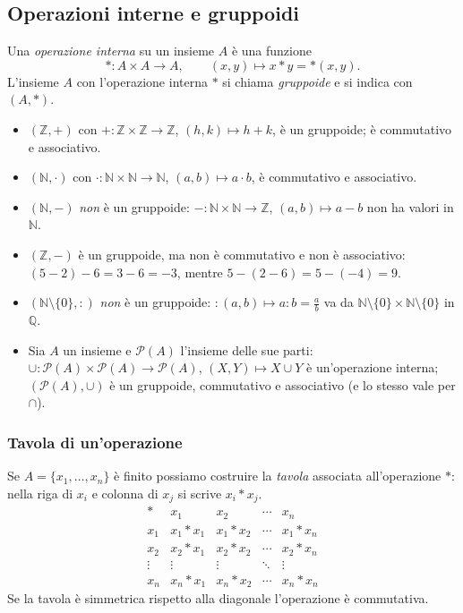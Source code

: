 \documentclass[11pt,a4paper]{article}
\begin{document}
\subsection{Operazioni interne e gruppoidi}

\begin{definizione}
Una \emph{operazione interna} su un insieme $A$ è una funzione
\[
  * : A \times A \to A, \qquad (x, y) \mapsto x * y = {*}(x, y).
\]
L'insieme $A$ con l'operazione interna $*$ si chiama \emph{gruppoide} e si indica con $(A, *)$.
\end{definizione}

\begin{esempio}
\begin{itemize}
  \item $(\mathbb{Z}, +)$ con $+ : \mathbb{Z}\times\mathbb{Z} \to \mathbb{Z}$, $(h, k) \mapsto h + k$, è un gruppoide; è commutativo e associativo.
  \item $(\mathbb{N}, \cdot)$ con $\cdot : \mathbb{N}\times\mathbb{N} \to \mathbb{N}$, $(a, b) \mapsto a\cdot b$, è commutativo e associativo.
  \item $(\mathbb{N}, -)$ \emph{non} è un gruppoide: $-: \mathbb{N}\times\mathbb{N} \to \mathbb{Z}$, $(a, b) \mapsto a - b$ non ha valori in $\mathbb{N}$.
  \item $(\mathbb{Z}, -)$ è un gruppoide, ma non è commutativo e non è associativo: $(5-2)-6 = 3 - 6 = -3$, mentre $5 - (2 - 6) = 5 - (-4) = 9$.
  \item $(\mathbb{N}\setminus\{0\}, :)$ \emph{non} è un gruppoide: $: (a, b) \mapsto a : b = \frac{a}{b}$ va da $\mathbb{N}\setminus\{0\} \times \mathbb{N}\setminus\{0\}$ in $\mathbb{Q}$.
  \item Sia $A$ un insieme e $\mathcal{P}(A)$ l'insieme delle sue parti: $\cup : \mathcal{P}(A)\times\mathcal{P}(A) \to \mathcal{P}(A)$, $(X, Y) \mapsto X \cup Y$ è un'operazione interna; $(\mathcal{P}(A), \cup)$ è un gruppoide, commutativo e associativo (e lo stesso vale per $\cap$).
\end{itemize}
\end{esempio}

\subsubsection{Tavola di un'operazione}

Se $A = \{x_1, \dots, x_n\}$ è finito possiamo costruire la \emph{tavola} associata all'operazione $*$: nella riga di $x_i$ e colonna di $x_j$ si scrive $x_i * x_j$.
\[
\begin{array}{c|cccc}
  * & x_1 & x_2 & \cdots & x_n \\ \hline
  x_1 & x_1 * x_1 & x_1 * x_2 & \cdots & x_1 * x_n \\
  x_2 & x_2 * x_1 & x_2 * x_2 & \cdots & x_2 * x_n \\
  \vdots & \vdots & \vdots & \ddots & \vdots \\
  x_n & x_n * x_1 & x_n * x_2 & \cdots & x_n * x_n
\end{array}
\]
Se la tavola è simmetrica rispetto alla diagonale l'operazione è commutativa.
\end{document}
